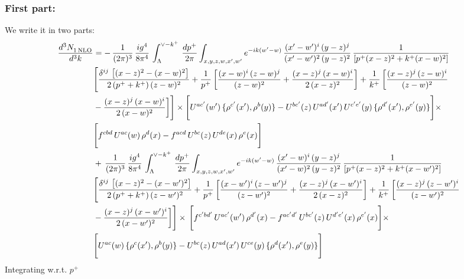 \documentclass[9pt]{article}
\numberwithin{equation}{section}
\begin{document}
\subsubsection{First part:\,}
We write it in two parts: 
\begin{align}
    \frac{d^{3}N_{1\,\rm NLO}^{\rm}}{d^{3}k}  & = -\,\frac{1}{(2\pi)^{3}}\, \frac{ig^{4}}{8\pi^{4}}\, \int_{\Lambda}^{\vee-k^{+}}\, \frac{dp^{+}}{2\pi}\int_{x,y,z,w,x',w^{\prime}} e^{-ik(w^{\prime}-w)}\, \frac{(x'-w')^{i}\,(y-z)^{j}}{(x'-w')^{2}\,(y-z)^{2}}\,\frac{1}{\left[p^{+}(x-z)^{2}+k^{+}(x-w)^{2}\right]} \notag \\ & \Bigg[\frac{\delta^{ij}\, \left[(x-z)^{2}-(x-w)^{2}\right]}{2\, (p^{+}+k^{+})\,(z-w)^{2}}+\frac{1}{p^{+}}\, \bigg[\frac{(x-w)^{i}\,(z-w)^{j}}{(z-w)^{2}}+\frac{(x-z)^{j}\,(x-w)^{i}}{2\,(x-z)^{2}}\bigg]+\frac{1}{k^{+}}\,\bigg[\frac{(x-z)^{j}\,(z-w)^{i}}{(z-w)^{2}}\notag \\ & -\frac{(x-z)^{j}\,(x-w)^{i}}{2\,(x-w)^{2}}\bigg]\Bigg]\times \Bigg[U^{ac'}(w')\,\{\rho^{c'}(x'),\rho^{b}(y)\}-U^{bc'}(z)\,U^{ad'}(x')\,U^{c'e'}(y)\, \{\rho^{d'}(x'),\rho^{e'}(y)\}\Bigg]\times \notag \\ & \Bigg[f^{cbd}\,U^{ac}(w)\,\rho^{d}(x)-f^{acd}\, U^{bc}(z)\,U^{de}(x)\,\rho^{e}(x)\Bigg]\notag \\ & +\,\frac{1}{(2\pi)^{3}}\, \frac{ig^{4}}{8\pi^{4}}\, \int_{\Lambda}^{\vee-k^{+}}\,\frac{dp^{+}}{2\pi}\int_{x,y,z,w,x',w^{\prime}} e^{-ik(w^{\prime}-w)}\, \frac{(x'-w)^{i}\,(y-z)^{j}}{(x'-w)^{2}\,(y-z)^{2}}\,\frac{1}{\left[p^{+}(x-z)^{2}+k^{+}(x-w')^{2}\right]} \notag \\ & \Bigg[\frac{\delta^{ij}\, \left[(x-z)^{2}-(x-w')^{2}\right]}{2\, (p^{+}+k^{+})\,(z-w')^{2}}+\frac{1}{p^{+}}\, \bigg[\frac{(x-w')^{i}\,(z-w')^{j}}{(z-w')^{2}}+\frac{(x-z)^{j}\,(x-w')^{i}}{2\,(x-z)^{2}}\bigg]+\frac{1}{k^{+}}\,\bigg[\frac{(x-z)^{j}\,(z-w')^{i}}{(z-w')^{2}}\notag \\ & -\frac{(x-z)^{j}\,(x-w')^{i}}{2\,(x-w')^{2}}\bigg]\Bigg]\times\,\Bigg[f^{c'bd'}\,U^{ac'}(w')\,\rho^{d'}(x)-f^{ac'd'}\, U^{bc'}(z)\,U^{d'e'}(x)\,\rho^{e'}(x)\Bigg] \times \notag \\ & \Bigg[U^{ac}(w)\,\{\rho^{c}(x'),\rho^{b}(y)\}-U^{bc}(z)\,U^{ad}(x')\,U^{ce}(y)\, \{\rho^{d}(x'),\rho^{e}(y)\}\Bigg]
\end{align}
Integrating w.r.t. $p^{+}$ 
\end{document}
